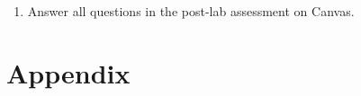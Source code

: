 \documentclass{article} %
\begin{document}
\begin{enumerate}
\begin{itemize}
        \item The plot should be 3.5'' tall and 6.5'' wide.
        \item Properly annotate your plot: axis labels, title, legend, etc.
        \item Text should be included of the individual time constants.
        \begin{itemize}
            \item Use title: ``FirstName LastName's Error Fraction Plot''.
        \end{itemize}
        \item Set axis grid lines on, box off, and figure background color to white.
    \end{itemize}
    \item Answer all questions in the post-lab assessment on Canvas.
\end{enumerate}

\clearpage

\section{Appendix}
\label{ap:AD594}
%

%

%

%
\end{document}

